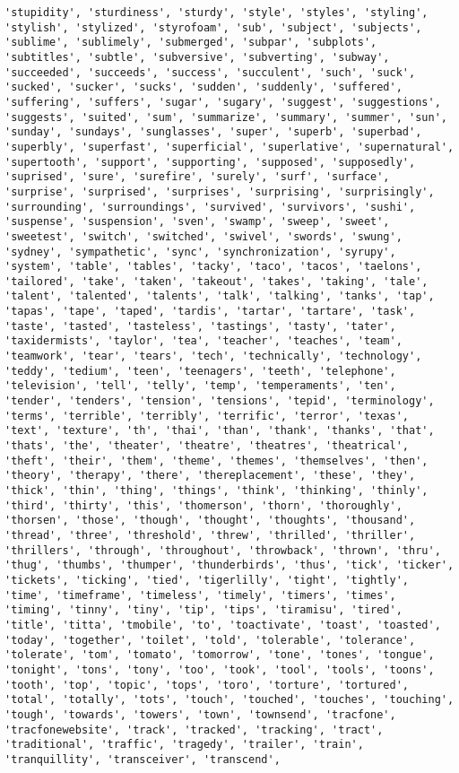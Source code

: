 \documentclass[11pt]{article}
\begin{document}
\begin{Verbatim}[commandchars=\\\{\}]
'stupidity', 'sturdiness', 'sturdy', 'style', 'styles', 'styling', 'stylish', 'stylized', 'styrofoam', 'sub', 'subject', 'subjects', 'sublime', 'sublimely', 'submerged', 'subpar', 'subplots', 'subtitles', 'subtle', 'subversive', 'subverting', 'subway', 'succeeded', 'succeeds', 'success', 'succulent', 'such', 'suck', 'sucked', 'sucker', 'sucks', 'sudden', 'suddenly', 'suffered', 'suffering', 'suffers', 'sugar', 'sugary', 'suggest', 'suggestions', 'suggests', 'suited', 'sum', 'summarize', 'summary', 'summer', 'sun', 'sunday', 'sundays', 'sunglasses', 'super', 'superb', 'superbad', 'superbly', 'superfast', 'superficial', 'superlative', 'supernatural', 'supertooth', 'support', 'supporting', 'supposed', 'supposedly', 'suprised', 'sure', 'surefire', 'surely', 'surf', 'surface', 'surprise', 'surprised', 'surprises', 'surprising', 'surprisingly', 'surrounding', 'surroundings', 'survived', 'survivors', 'sushi', 'suspense', 'suspension', 'sven', 'swamp', 'sweep', 'sweet', 'sweetest', 'switch', 'switched', 'swivel', 'swords', 'swung', 'sydney', 'sympathetic', 'sync', 'synchronization', 'syrupy', 'system', 'table', 'tables', 'tacky', 'taco', 'tacos', 'taelons', 'tailored', 'take', 'taken', 'takeout', 'takes', 'taking', 'tale', 'talent', 'talented', 'talents', 'talk', 'talking', 'tanks', 'tap', 'tapas', 'tape', 'taped', 'tardis', 'tartar', 'tartare', 'task', 'taste', 'tasted', 'tasteless', 'tastings', 'tasty', 'tater', 'taxidermists', 'taylor', 'tea', 'teacher', 'teaches', 'team', 'teamwork', 'tear', 'tears', 'tech', 'technically', 'technology', 'teddy', 'tedium', 'teen', 'teenagers', 'teeth', 'telephone', 'television', 'tell', 'telly', 'temp', 'temperaments', 'ten', 'tender', 'tenders', 'tension', 'tensions', 'tepid', 'terminology', 'terms', 'terrible', 'terribly', 'terrific', 'terror', 'texas', 'text', 'texture', 'th', 'thai', 'than', 'thank', 'thanks', 'that', 'thats', 'the', 'theater', 'theatre', 'theatres', 'theatrical', 'theft', 'their', 'them', 'theme', 'themes', 'themselves', 'then', 'theory', 'therapy', 'there', 'thereplacement', 'these', 'they', 'thick', 'thin', 'thing', 'things', 'think', 'thinking', 'thinly', 'third', 'thirty', 'this', 'thomerson', 'thorn', 'thoroughly', 'thorsen', 'those', 'though', 'thought', 'thoughts', 'thousand', 'thread', 'three', 'threshold', 'threw', 'thrilled', 'thriller', 'thrillers', 'through', 'throughout', 'throwback', 'thrown', 'thru', 'thug', 'thumbs', 'thumper', 'thunderbirds', 'thus', 'tick', 'ticker', 'tickets', 'ticking', 'tied', 'tigerlilly', 'tight', 'tightly', 'time', 'timeframe', 'timeless', 'timely', 'timers', 'times', 'timing', 'tinny', 'tiny', 'tip', 'tips', 'tiramisu', 'tired', 'title', 'titta', 'tmobile', 'to', 'toactivate', 'toast', 'toasted', 'today', 'together', 'toilet', 'told', 'tolerable', 'tolerance', 'tolerate', 'tom', 'tomato', 'tomorrow', 'tone', 'tones', 'tongue', 'tonight', 'tons', 'tony', 'too', 'took', 'tool', 'tools', 'toons', 'tooth', 'top', 'topic', 'tops', 'toro', 'torture', 'tortured', 'total', 'totally', 'tots', 'touch', 'touched', 'touches', 'touching', 'tough', 'towards', 'towers', 'town', 'townsend', 'tracfone', 'tracfonewebsite', 'track', 'tracked', 'tracking', 'tract', 'traditional', 'traffic', 'tragedy', 'trailer', 'train', 'tranquillity', 'transceiver', 'transcend', 
\end{Verbatim}
\end{document}
